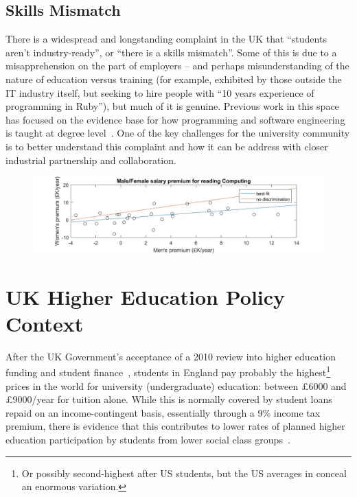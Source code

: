 \documentclass[conference]{IEEEtran}
\begin{document}
\subsection{Skills Mismatch}\label{sec:Skills}

There is a widespread and longstanding complaint in the UK that
``students aren't industry-ready'', or ``there is a skills
mismatch''. Some of this is due to a misapprehension on the part of
employers -- and perhaps misunderstanding of the nature of education
versus training (for example, exhibited by those outside the IT
industry itself, but seeking to hire people with ``10 years experience
of programming in Ruby''), but much of it is genuine. Previous work in
this space has focused on the evidence base for how programming and
software engineering is taught at degree
level~\cite{davenport-et-al:latice2016,murphy-et-al:programming2017,simon-et-al:sigcse2018}. One
of the key challenges for the university community is to better
understand this complaint and how it can be address with closer
industrial partnership and collaboration.

\begin{figure}
\includegraphics[width=\textwidth]{images/BBCSalaryDatav5.jpg}
\caption{\label{fig:BBC}}
\end{figure}

\section{UK Higher Education Policy Context}\label{ukhepolicy}

After the UK Government's acceptance of a 2010 review into higher
education funding and student finance~\cite{BIS2010a}, students in
England pay probably the highest\footnote{Or possibly second-highest
after US students, but the US averages in \cite[Table B5.1]{OECD2016a}
conceal an enormous variation.} prices in the world for university
(undergraduate) education: between \pounds6000 and \pounds9000/year
for tuition alone. While this is normally covered by student loans
repaid on an income-contingent basis, essentially through a 9\% income
tax premium, there is evidence that this contributes to lower rates of
planned higher education participation by students from lower social
class groups~\cite{CallenderMason2017a}.
\end{document}
